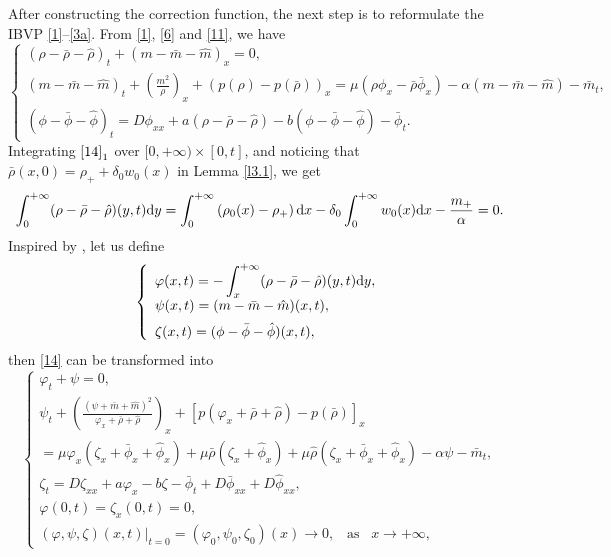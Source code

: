 \documentclass[11pt]{article}
\theoremstyle{plain}
\numberwithin{equation}{section}
\begin{document}
	After constructing the correction function, the next step is to reformulate the IBVP \eqref{1}--\eqref{3a}. From \eqref{1}, \eqref{6} and \eqref{11}, we have
\begin{equation}\label{14}
		\left\{
		\begin{array}{lr}
			(\rho-\bar\rho-\hat\rho)_t+(m-\bar m-\hat m)_x=0, \\[2mm]
			(m-\bar m-\hat m)_t+\left(\frac{m^2}{\rho}\right)_x+(p(\rho)-p(\bar\rho))_x=\mu(\rho\phi_x-\bar\rho\bar{\phi}_x)-\alpha (m-\bar m-\hat m)-\bar{m}_t,\\[2mm]
			(\phi-\bar \phi-\hat \phi)_t=D\phi_{xx}+a(\rho-\bar\rho-\hat\rho)-b(\phi-\bar \phi-\hat \phi)-\bar{\phi}_t.
		\end{array}
		\right.
	\end{equation}
Integrating $\eqref{14}_{1}$ over $[0,+\infty) \times [0,t]$, and noticing that $\bar{\rho}(x,0)=\rho_{+}+\delta_{0}w_{0}(x)$ in Lemma \ref{l3.1}, we get
\begin{equation}\label{15}
\int_{0}^{+\infty}(\rho-\bar{\rho}-\hat{\rho})(y, t) {\rm d}y=\int_{0}^{+\infty}\left(\rho_{0}(x)-\rho_{+}\right) {\rm d} x-\delta_{0} \int_{0}^{+\infty} w_{0}(x) {\rm d} x-\frac{m_{+}}{\alpha}=0.
\end{equation}
Inspired by \cite{Hsiao-Liu1992}, let us define 
	\begin{equation}\label{15a}
		\left\{
		\begin{array}{lr}
			\varphi(x,t)=-\displaystyle\int^{+\infty}_{x}(\rho-\bar\rho-\hat\rho)(y,t){\rm d}y,\\[2mm]
			\psi(x,t)=(m-\bar m-\hat m)(x,t),\\[2mm]
			\zeta(x,t)=(\phi-\bar\phi-\hat\phi)(x,t),
		\end{array}
		\right.
	\end{equation}
then \eqref{14} can be transformed into
	\begin{equation}\label{18}
		\left\{
		\begin{array}{lr}
			\varphi_t+\psi=0,\\[2mm]
			\psi_t+\displaystyle\left(\frac{(\psi+\bar m+\hat m)^2}{\varphi_x+\bar\rho+\hat\rho}\right)_x+\left[p(\varphi_x+\bar\rho+\hat\rho)-p(\bar\rho)\right]_x\\[2mm]
			=\mu \varphi_x(\zeta_x+\bar\phi_x+\hat\phi_x)+\mu\bar\rho(\zeta_x+\hat\phi_x)+\mu\hat\rho(\zeta_x+\bar\phi_x+\hat\phi_x)-\alpha \psi-\bar m_t,\\[2mm]
			\zeta_t=D\zeta_{xx}+a\varphi_x-b\zeta-\bar\phi_t+D\bar\phi_{xx}+D\hat\phi_{xx},\\[2mm]
			\varphi(0,t)=\zeta_x(0,t)=0,\\[2mm]
			(\varphi,\psi,\zeta)(x,t)|_{t=0}=(\varphi_0,\psi_0,\zeta_0)(x)\to0,\;\;\;\mbox{as}\;\;\; x\to+\infty,
		\end{array}
		\right.
	\end{equation}
\end{document}
